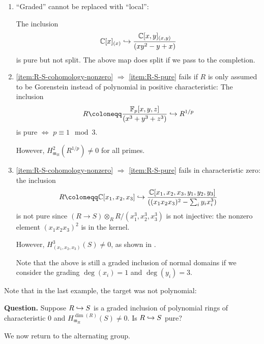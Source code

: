 \documentclass[12pt]{article}
\begin{document}
\begin{enumerate}[label=(\alph*)]
	\item ``Graded'' cannot be replaced with ``local'': \cite{ChakrabortyGurjarMiyanishi} 

	The inclusion
	\begin{equation*} 
		\mathbb{C}[x]_{(x)} \hookrightarrow \dfrac{\mathbb{C}[x, y]_{(x, y)}}{(xy^{2} - y + x)}
	\end{equation*}
	is pure but not split. \newline
	The above map does split if we pass to the completion.
	\item \ref{item:R-S-cohomology-nonzero} $\Rightarrow$ \ref{item:R-S-pure} fails if $R$ is only assumed to be Gorenstein instead of polynomial in positive characteristic: The inclusion
	\begin{equation*} 
		R \coloneqq \dfrac{\mathbb{F}_{p}[x, y, z]}{(x^{3} + y^{3} + z^{3})} \into R^{1/p}
	\end{equation*}
	is pure $\Leftrightarrow$ $p \equiv 1 \mod 3$. 

	However, $H_{\mathfrak{m}_{R}}^{2}(R^{1/p}) \neq 0$ for all primes.
	\item \ref{item:R-S-cohomology-nonzero} $\Rightarrow$ \ref{item:R-S-pure} fails in characteristic zero: the inclusion
	\begin{equation*} 
		R \coloneqq \mathbb{C}[x_{1}, x_{2}, x_{3}] \into \dfrac{\mathbb{C}[x_{1}, x_{2}, x_{3}, y_{1}, y_{2}, y_{3}]}{((x_{1} x_{2} x_{3})^{2} - \sum_{i} y_{i} x_{i}^{3})}
	\end{equation*}
	is not pure since $(R \to S) \otimes_{R} R/(x_{1}^{3}, x_{2}^{3}, x_{3}^{3})$ is not injective: the nonzero element $(x_{1} x_{2} x_{3})^{2}$ is in the kernel. 

	However, $H_{(x_{1}, x_{2}, x_{3})}^{3}(S) \neq 0$, as shown in \cite{RobertsComputationLocalCohomology}. 

	Note that the above is still a graded inclusion of normal domains if we consider the grading $\deg(x_{i}) = 1$ and $\deg(y_{i}) = 3$.
\end{enumerate}

Note that in the last example, the target was not polynomial:

\textbf{Question.} Suppose $R \hookrightarrow S$ is a graded inclusion of polynomial rings of characteristic $0$ and $H_{\mathfrak{m}_{R}}^{\dim(R)}(S) \neq 0$. Is $R \hookrightarrow S$ pure?

We now return to the alternating group.
\end{document}

